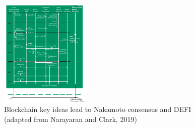 \documentclass[final,5p,times,twocolumn,authoryear]{elsarticle}
\begin{document}





\begin{figure}
    \centering
    \label{fig:narayanan}
    \includegraphics[width=0.38\textwidth]{narayanan3.png}
    \vspace*{-0.3cm}
    \caption{Blockchain key ideas lead to Nakamoto consensus and DEFI\\ (adapted from Narayaran and Clark, 2019)}
\end{figure}
    
\end{document}
